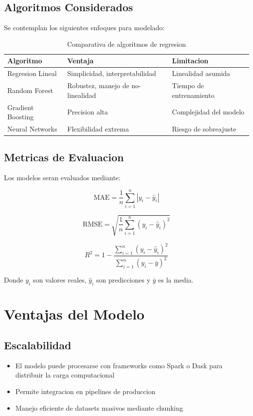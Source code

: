 \documentclass[12pt,a4paper]{article}
\begin{document}
\subsection{Algoritmos Considerados}
Se contemplan los siguientes enfoques para modelado:

\begin{table}[H]
\centering
\begin{tabular}{|l|l|l|}
\hline
\textbf{Algoritmo} & \textbf{Ventaja} & \textbf{Limitacion} \\
\hline
Regresion Lineal & Simplicidad, interpretabilidad & Linealidad asumida \\
Random Forest & Robustez, manejo de no-linealidad & Tiempo de entrenamiento \\
Gradient Boosting & Precision alta & Complejidad del modelo \\
Neural Networks & Flexibilidad extrema & Riesgo de sobreajuste \\
\hline
\end{tabular}
\caption{Comparativa de algoritmos de regresion}
\end{table}

\subsection{Metricas de Evaluacion}
Los modelos seran evaluados mediante:

\begin{equation}
\text{MAE} = \frac{1}{n}\sum_{i=1}^{n}|y_i - \hat{y}_i|
\end{equation}

\begin{equation}
\text{RMSE} = \sqrt{\frac{1}{n}\sum_{i=1}^{n}(y_i - \hat{y}_i)^2}
\end{equation}

\begin{equation}
R^2 = 1 - \frac{\sum_{i=1}^{n}(y_i - \hat{y}_i)^2}{\sum_{i=1}^{n}(y_i - \bar{y})^2}
\end{equation}

Donde $y_i$ son valores reales, $\hat{y}_i$ son predicciones y $\bar{y}$ es la media.

\section{Ventajas del Modelo}

\subsection{Escalabilidad}
\begin{itemize}
    \item El modelo puede procesarse con frameworks como Spark o Dask para distribuir la carga computacional
    \item Permite integracion en pipelines de produccion
    \item Manejo eficiente de datasets masivos mediante chunking
\end{itemize}
\end{document}
